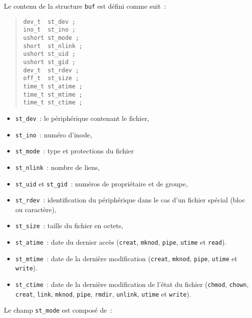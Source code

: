 \documentclass [twoside] {report}
\begin{document}
Le contenu de la structure {\tt buf} est défini
comme suit~:

\begin {quote}
\begin {verbatim}
dev_t  st_dev ;
ino_t  st_ino ;
ushort st_mode ;
short  st_nlink ;
ushort st_uid ;
ushort st_gid ;
dev_t  st_rdev ;
off_t  st_size ;
time_t st_atime ;
time_t st_mtime ;
time_t st_ctime ;
\end{verbatim}
\end {quote}

\begin {itemize}
    \item {\tt st\_dev}~: le périphérique contenant le fichier,
    \item {\tt st\_ino}~: numéro d'inode,
    \item {\tt st\_mode}~: type et protections du fichier
    \item {\tt st\_nlink}~: nombre de liens,
    \item {\tt st\_uid} et {\tt st\_gid}~: numéros de propriétaire et de groupe,
    \item {\tt st\_rdev}~: identification du périphérique dans le cas
	d'un fichier spécial (bloc ou caractère),
    \item {\tt st\_size}~: taille du fichier en octets,
    \item {\tt st\_atime}~: date du dernier accès ({\tt creat},
	{\tt mknod}, {\tt pipe}, {\tt utime} et {\tt read}).
    \item {\tt st\_mtime}~: date de la dernière modification
	({\tt creat}, {\tt mknod}, {\tt pipe}, {\tt utime} et {\tt write}).
    \item {\tt st\_ctime}~: date de la dernière modification
	de l'état du fichier ({\tt chmod}, {\tt chown}, {\tt creat},
	{\tt link}, {\tt mknod}, {\tt pipe}, {\tt rmdir}, {\tt unlink},
	{\tt utime} et {\tt write}).
\end {itemize}

Le champ {\tt st\_mode} est composé de~:
\end{document}
